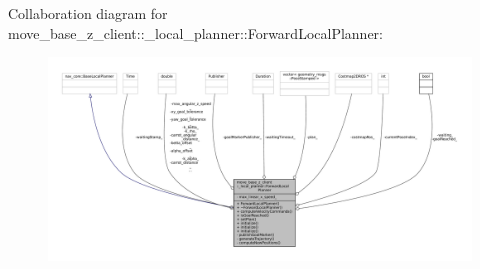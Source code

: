 Collaboration diagram for move\+\_\+base\+\_\+z\+\_\+client\+:\+:\+\_\+local\+\_\+planner\+:\+:Forward\+Local\+Planner\+:
\nopagebreak
\begin{figure}[H]
\begin{center}
\leavevmode
\includegraphics[width=350pt]{classmove__base__z__client_1_1__local__planner_1_1ForwardLocalPlanner__coll__graph}
\end{center}
\end{figure}

